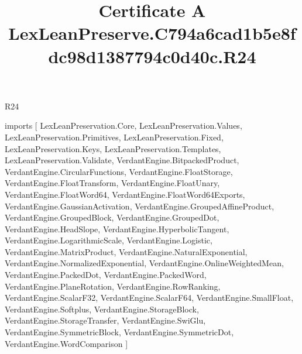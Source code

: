 \begin{lexlean}{R24}
\title{Certificate A LexLeanPreserve.C794a6cad1b5e8fdc98d1387794c0d40c.R24}
\begin{coremodule}
imports [
  LexLeanPreservation.Core,
  LexLeanPreservation.Values,
  LexLeanPreservation.Primitives,
  LexLeanPreservation.Fixed,
  LexLeanPreservation.Keys,
  LexLeanPreservation.Templates,
  LexLeanPreservation.Validate,
  VerdantEngine.BitpackedProduct,
  VerdantEngine.CircularFunctions,
  VerdantEngine.FloatStorage,
  VerdantEngine.FloatTransform,
  VerdantEngine.FloatUnary,
  VerdantEngine.FloatWord64,
  VerdantEngine.FloatWord64Exports,
  VerdantEngine.GaussianActivation,
  VerdantEngine.GroupedAffineProduct,
  VerdantEngine.GroupedBlock,
  VerdantEngine.GroupedDot,
  VerdantEngine.HeadSlope,
  VerdantEngine.HyperbolicTangent,
  VerdantEngine.LogarithmicScale,
  VerdantEngine.Logistic,
  VerdantEngine.MatrixProduct,
  VerdantEngine.NaturalExponential,
  VerdantEngine.NormalizedExponential,
  VerdantEngine.OnlineWeightedMean,
  VerdantEngine.PackedDot,
  VerdantEngine.PackedWord,
  VerdantEngine.PlaneRotation,
  VerdantEngine.RowRanking,
  VerdantEngine.ScalarF32,
  VerdantEngine.ScalarF64,
  VerdantEngine.SmallFloat,
  VerdantEngine.Softplus,
  VerdantEngine.StorageBlock,
  VerdantEngine.StorageTransfer,
  VerdantEngine.SwiGlu,
  VerdantEngine.SymmetricBlock,
  VerdantEngine.SymmetricDot,
  VerdantEngine.WordComparison
]


\end{coremodule}
\end{lexlean}
